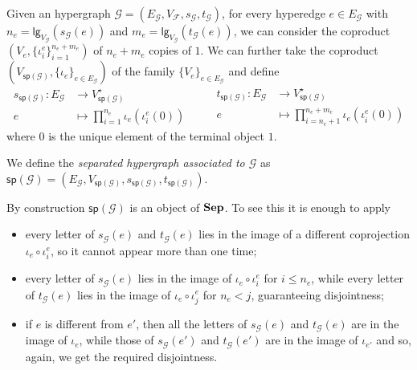 \documentclass[3p]{elsarticle}
\newcommand{\lgh}{\mathsf{lg}}
\newcommand{\catname}[1]{\textbf{\textup{#1}}}
\newcommand{\shyp}{\catname{Sep}}
\renewcommand{\sp}{\mathsf{sp}}
\theoremstyle{remark}
\theoremstyle{definition}
\begin{document}
\begin{defi}
Given an hypergraph $\mathcal{\mathcal{G}}=(E_{\mathcal{G}}, V_{\mathcal{F}}, s_{\mathcal{G}}, t_{\mathcal{G}})$, for every hyperedge $e\in E_{\mathcal{G}}$ with $n_e=\lgh_{V_{\mathcal{G}}}(s_{\mathcal{G}}(e))$ and $m_e=\lgh_{V_{\mathcal{G}}}(t_{\mathcal{G}}(e))$, we can consider the coproduct $(V_e, \{\iota^e_{i}\}_{i=1}^{n_e+m_e})$ of $n_e+m_e$ copies of $1$.
We can further take the coproduct $(V_{\sp(\mathcal{G})}, \{\iota_e\}_{e\in E_{\mathcal{G}}})$ of the family $\{V_{e}\}_{e\in E_\mathcal{G}}$ and define
\[\begin{split}
	s_{\sp(\mathcal{G})} \colon E_{\mathcal{G}}&\to V_{\sp(\mathcal{G})}^\star\\
	e &\mapsto \prod_{i=1}^{n_e} \iota_e(\iota^e_{i}(0))
\end{split}\qquad \begin{split}
	t_{\sp(\mathcal{G})} \colon E_{\mathcal{G}}&\to V_{\sp(\mathcal{G})}^\star\\
	e &\mapsto \prod_{i=n_e+1}^{n_e + m_e} \iota_e(\iota^e_{i}(0))
\end{split} \]
where $0$ is the unique element of the terminal object $1$. 

We define the \emph{separated hypergraph associated to $\mathcal{G}$}  as $\sp(\mathcal{G}) = (E_{\mathcal{G}}, V_{\sp(\mathcal{G})}, s_{\sp(\mathcal{G})}, t_{\sp(\mathcal{G})})$.
\end{defi}
\begin{rem}\label{rem:ob}
 By construction $\sp(\mathcal{G})$ is an object of $\shyp$. To see this it is enough to apply 
 \begin{itemize}
 	\item every letter of $s_{\mathcal{G}}(e)$ and $t_{\mathcal{G}}(e)$ lies in the image of a different coprojection $\iota_e\circ \iota^e_i$, so it cannot appear more than one time;
 	\item every letter of $s_{\mathcal{G}}(e)$ lies in the image of $\iota_{e}\circ \iota^e_i$  for $i\leq n_e$, while every letter of $t_{\mathcal{G}}(e)$ lies in the image of $\iota_{e}\circ \iota^e_j$  for $n_e < j$, guaranteeing disjointness;
 	\item if $e$ is different from $e'$, then all the letters of $s_{\mathcal{G}}(e)$ and $t_{\mathcal{G}}(e)$ are  in the image of $\iota_e$, while those of  $s_{\mathcal{G}}(e')$ and $t_{\mathcal{G}}(e')$ are in the image of $\iota_{e'}$ and so, again, we get the required disjointness. 
 \end{itemize}
\end{rem}
\end{document}
